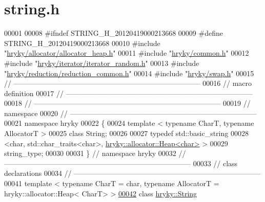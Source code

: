 \hypertarget{string_8h_source}{\section{string.\-h}
}

\begin{DoxyCode}
00001 
00008 \textcolor{preprocessor}{#ifndef STRING\_H\_20120419000213668}
00009 \textcolor{preprocessor}{}\textcolor{preprocessor}{#define STRING\_H\_20120419000213668}
00010 \textcolor{preprocessor}{}\textcolor{preprocessor}{#include "\hyperlink{allocator__heap_8h}{hryky/allocator/allocator_heap.h}"}
00011 \textcolor{preprocessor}{#include "\hyperlink{common_8h}{hryky/common.h}"}
00012 \textcolor{preprocessor}{#include "\hyperlink{iterator__random_8h}{hryky/iterator/iterator_random.h}"}
00013 \textcolor{preprocessor}{#include "\hyperlink{reduction__common_8h}{hryky/reduction/reduction_common.h}"}
00014 \textcolor{preprocessor}{#include "\hyperlink{swap_8h}{hryky/swap.h}"}
00015 \textcolor{comment}{//
      ------------------------------------------------------------------------------}
00016 \textcolor{comment}{// macro definition}
00017 \textcolor{comment}{//
      ------------------------------------------------------------------------------}
00018 \textcolor{comment}{//
      ------------------------------------------------------------------------------}
00019 \textcolor{comment}{// namespace}
00020 \textcolor{comment}{//
      ------------------------------------------------------------------------------}
00021 \textcolor{keyword}{namespace }hryky
00022 \{
00024     \textcolor{keyword}{template} < \textcolor{keyword}{typename} CharT, \textcolor{keyword}{typename} AllocatorT >
00025     \textcolor{keyword}{class }String;
00026 
00027     \textcolor{keyword}{typedef} std::basic\_string
00028         <char, std::char\_traits<char>, \hyperlink{classhryky_1_1allocator_1_1_heap}{hryky::allocator::Heap<char>} >
00029             string\_type;
00030 
00031 \} \textcolor{comment}{// namespace hryky}
00032 \textcolor{comment}{//
      ------------------------------------------------------------------------------}
00033 \textcolor{comment}{// class declarations}
00034 \textcolor{comment}{//
      ------------------------------------------------------------------------------}
00041 \textcolor{comment}{}\textcolor{keyword}{template} < \textcolor{keyword}{typename} CharT = \textcolor{keywordtype}{char}, \textcolor{keyword}{typename} AllocatorT = hryky::allocator::Heap<
      CharT> >
\hypertarget{string_8h_source_l00042}{}\hyperlink{classhryky_1_1_string}{00042} \textcolor{keyword}{class }\hyperlink{classhryky_1_1_string}{hryky::String}

\end{DoxyCode}
